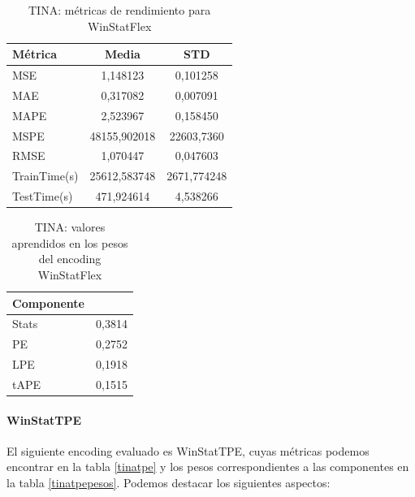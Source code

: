 \begin{table}[!ht]
	\centering
	\begin{tabular}{l|c|c}
		\toprule
		Métrica & Media & STD \\
		\midrule
		MSE & 1,148123 & 0,101258 \\
		MAE & 0,317082 & 0,007091 \\
		MAPE & 2,523967 & 0,158450 \\
		MSPE & 48155,902018 & 22603,7360 \\
		RMSE & 1,070447 & 0,047603 \\
		TrainTime(s) & 25612,583748 & 2671,774248 \\
		TestTime(s) & 471,924614 & 4,538266 \\
		\bottomrule
	\end{tabular}
	\caption{TINA: métricas de rendimiento para WinStatFlex}
	\label{tinaflex}
\end{table}
 
\begin{table}[!ht]
	\centering
		\begin{tabular}{l|N}
		\toprule
		Componente &  \\
		\midrule
		Stats & 0,3814 \\
		PE & 0,2752 \\
		LPE & 0,1918 \\
		tAPE & 0,1515 \\
		\bottomrule
	\end{tabular}
	\caption{TINA: valores aprendidos en los pesos del encoding WinStatFlex}
	\label{tinaflexpesos}
\end{table}

\paragraph{WinStatTPE}

El siguiente encoding evaluado es WinStatTPE, cuyas métricas podemos encontrar en la tabla \ref{tinatpe} y los pesos correspondientes a las componentes en la tabla \ref{tinatpepesos}. Podemos destacar los siguientes aspectos:

